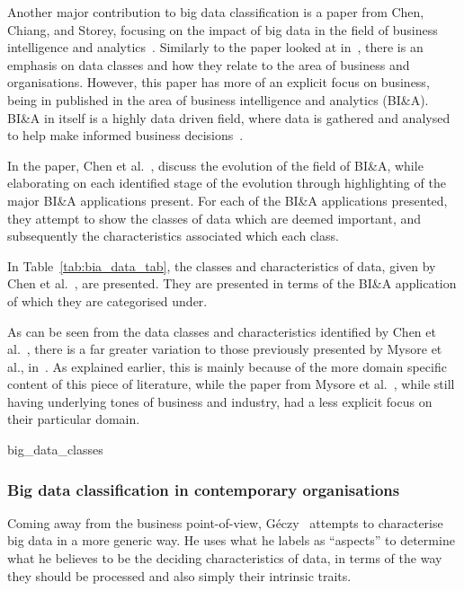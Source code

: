 Another major contribution to big data classification is a paper from Chen, Chiang, and Storey, focusing on the impact
of big data in the field of business intelligence and analytics~\cite{chen2012business}. Similarly to the paper looked
at in~, there is an emphasis on data classes and how they relate to the area of business and
organisations. However, this paper has more of an explicit focus on business, being in published in the area of business
intelligence and analytics (BI\&A). BI\&A in itself is a highly data driven field, where data is gathered and analysed
to help make informed business decisions~\cite{watson2009tutorial}.

In the paper, Chen et al.~\cite{chen2012business}, discuss the evolution of the field of BI\&A, while elaborating on
each identified stage of the evolution through highlighting of the major BI\&A applications present. For each of the
BI\&A applications presented, they attempt to show the classes of data which are deemed important, and subsequently the
characteristics associated which each class.

In Table~\ref{tab:bia_data_tab}, the classes and characteristics of data, given by Chen et
al.~\cite{chen2012business}, are presented. They are presented in terms of the BI\&A application of which they
are categorised under.

As can be seen from the data classes and characteristics identified by Chen et al.~\cite{chen2012business}, there is a
far greater variation to those previously presented by Mysore et al., in~\cite{bifet_mining_2013}. As explained earlier,
this is mainly because of the more domain specific content of this piece of literature, while the paper from Mysore et
al.~\cite{bifet_mining_2013}, while still having underlying tones of business and industry, had a less explicit focus on
their particular domain.

{big_data_classes}



\subsubsection{Big data classification in contemporary organisations} %
\label{ssub:big_data_contemp}

Coming away from the business point-of-view, G\'eczy~\cite{geczy_big_2014} attempts to characterise big data in a more
generic way. He uses what he labels as ``aspects'' to determine what he believes to be the deciding characteristics of
data, in terms of the way they should be processed and also simply their intrinsic traits.

